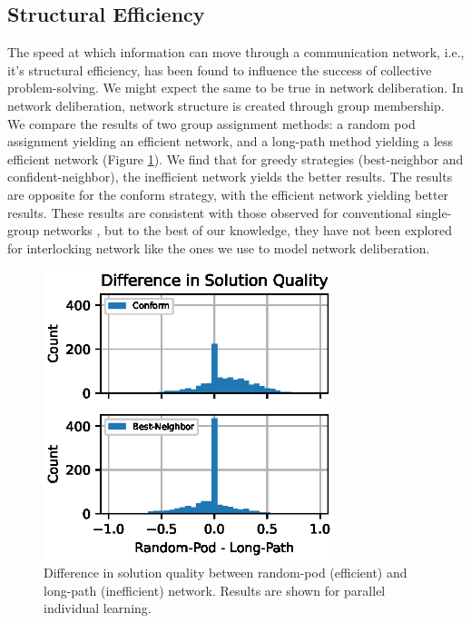 \subsection{Structural Efficiency}

The speed at which information can move through a communication network, i.e., it's structural efficiency, has been found to influence the success of collective problem-solving. We might expect the same to be true in network deliberation. In network deliberation, network structure is created through group membership. We compare the results of two group assignment methods: a random pod assignment yielding an efficient network, and a long-path method yielding a less efficient network (Figure \ref{fig:results-netdelib-efficiency}). We find that for greedy strategies (best-neighbor and confident-neighbor), the inefficient network yields the better results. The results are opposite for the conform strategy, with the efficient network yielding better results. These results are consistent with those observed for conventional single-group networks \cite{barkoczi_social_2016}, but to the best of our knowledge, they have not been explored for interlocking network like the ones we use to model network deliberation.

\begin{figure}
    \centering
    \includegraphics[width=3.33in]{chapters/figures/NetDelibABM/fig-results-netdelib-efficiency.eps}
	\caption{Difference in solution quality between random-pod (efficient) and long-path (inefficient) network. Results are shown for parallel individual learning.}
    \label{fig:results-netdelib-efficiency}
\end{figure}


